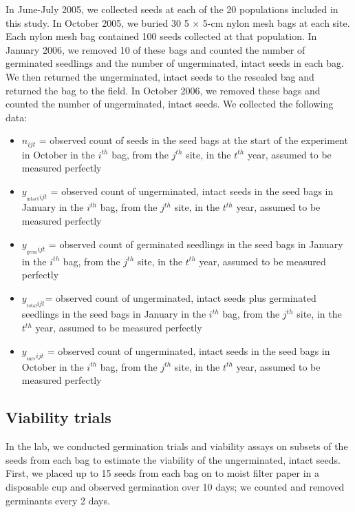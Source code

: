 \documentclass[12pt, oneside, titlepage]{article}   	%
\begin{document}
In June-July 2005, we collected seeds at each of the 20 populations included in this study. In October 2005, we buried 30 5 $\times$ 5-cm nylon mesh bags at each site. Each nylon mesh bag contained 100 seeds collected at that population. In January 2006, we removed 10 of these bags and counted the number of germinated seedlings and the number of ungerminated, intact seeds in each bag. We then returned the ungerminated, intact seeds to the resealed bag and returned the bag to the field. In October 2006, we removed these bags and counted the number of ungerminated, intact seeds. We collected the following data:

\begin{itemize}
	\item $n_{ijt}$ = observed count of seeds in the seed bags at the start of the experiment in October in the $i^{th}$ bag, from the $j^{th}$ site, in the $t^{th}$ year, assumed to be measured perfectly 
	\item $y_{_{\mathrm{intact}} ijt}$ = observed count of ungerminated, intact seeds in the seed bags in January in the $i^{th}$ bag, from the $j^{th}$ site, in the $t^{th}$ year,  assumed to be measured perfectly 
	\item $y_{_{\mathrm{germ}} ijt}$ = observed count of germinated seedlings in the seed bags in January in the $i^{th}$ bag, from the $j^{th}$ site, in the $t^{th}$ year, assumed to be measured perfectly 
	\item $y_{_{\mathrm{total}} ijt}$= observed count of ungerminated, intact seeds plus germinated seedlings in the seed bags in January in the $i^{th}$ bag, from the $j^{th}$ site, in the $t^{th}$ year, assumed to be measured perfectly 	
	\item $y_{_{\mathrm{surv}} ijt}$ = observed count of ungerminated, intact seeds in the seed bags in October in the $i^{th}$ bag, from the $j^{th}$ site, in the $t^{th}$ year, assumed to be measured perfectly 	
\end{itemize}

\subsection*{Viability trials}

In the lab, we conducted germination trials and viability assays on subsets of the seeds from each bag to estimate the viability of the ungerminated, intact seeds. First, we placed up to 15 seeds from each bag on to moist filter paper in a disposable cup and observed germination over 10 days; we counted and removed germinants every 2 days. 
\end{document}
